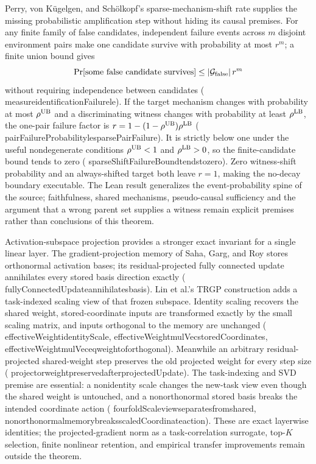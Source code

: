 \documentclass[11pt]{article}
\newcommand{\leanname}[1]{{\scriptsize\ttfamily
  \def\_{\textunderscore\allowbreak}#1}}
\begin{document}
Perry, von K\"ugelgen, and Sch\"olkopf's sparse-mechanism-shift rate
\cite{perry2022sms} supplies the missing probabilistic amplification step
without hiding its causal premises.  For any finite family of false candidates,
independent failure events across $m$ disjoint environment pairs make one
candidate survive with probability at most $r^m$; a finite union bound gives
\[
  \Pr[\text{some false candidate survives}]
  \leq |{\cal G}_{\rm false}|\,r^m
\]
without requiring independence between candidates
(\leanname{measure\_identificationFailure\_le}).  If the target mechanism
changes with probability at most $\rho^{\rm UB}$ and a discriminating witness
changes with probability at least $\rho^{\rm LB}$, the one-pair failure factor
is
$r=1-(1-\rho^{\rm UB})\rho^{\rm LB}$
(\leanname{pairFailureProbability\_le\_sparsePairFailure}).  It is strictly
below one under the useful nondegenerate conditions
$\rho^{\rm UB}<1$ and $\rho^{\rm LB}>0$, so the finite-candidate bound tends to
zero (\leanname{sparseShiftFailureBound\_tendsto\_zero}).  Zero witness-shift
probability and an always-shifted target both leave $r=1$, making the no-decay
boundary executable.  The Lean result generalizes the event-probability spine
of the source; faithfulness, shared mechanisms, pseudo-causal sufficiency and
the argument that a wrong parent set supplies a witness remain explicit
premises rather than conclusions of this theorem.

Activation-subspace projection provides a stronger exact invariant for a
single linear layer.  The gradient-projection memory of Saha, Garg, and Roy
\cite{saha2021gpm} stores orthonormal activation bases; its residual-projected
fully connected update annihilates every stored basis direction exactly
(\leanname{fullyConnectedUpdate\_annihilates\_basis}).  Lin et al.'s TRGP
construction \cite{lin2022trgp} adds a task-indexed scaling view of that frozen
subspace.  Identity scaling recovers the shared weight, stored-coordinate
inputs are transformed exactly by the small scaling matrix, and inputs
orthogonal to the memory are unchanged
(\leanname{effectiveWeight\_identityScale},
\leanname{effectiveWeight\_mulVec\_storedCoordinates},
\leanname{effectiveWeight\_mulVec\_eq\_weight\_of\_orthogonal}).
Meanwhile an arbitrary residual-projected shared-weight step preserves the
old projected weight for every step size
(\leanname{projector\_weight\_preserved\_after\_projectedUpdate}).  The
task-indexing and SVD premise are essential: a nonidentity scale changes the
new-task view even though the shared weight is untouched, and a
nonorthonormal stored basis breaks the intended coordinate action
(\leanname{fourfoldScale\_view\_separates\_from\_shared},
\leanname{nonorthonormal\_memory\_breaks\_scaledCoordinate\_action}).
These are exact layerwise identities; the projected-gradient norm as a
task-correlation surrogate, top-$K$ selection, finite nonlinear retention,
and empirical transfer improvements remain outside the theorem.
\end{document}
